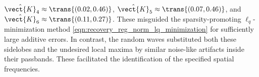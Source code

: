$\hat{\vect{K}}_{4} \approx \trans{ ( 0.02, 0.46 ) }$,
$\hat{\vect{K}}_{5} \approx \trans{ ( 0.07, 0.46 ) }$, and
$\hat{\vect{K}}_{6} \approx \trans{ ( 0.11, 0.27 ) }$.
These misguided
the sparsity-promoting $\ell_{q}$-minimization method
\eqref{eqn:recovery_reg_norm_lq_minimization} for
sufficiently large additive errors.
In contrast,
the random waves substituted both
these sidelobes and
the undesired local maxima by
similar noise-like artifacts inside
their passbands.
These facilitated
the identification of
the specified spatial frequencies.
